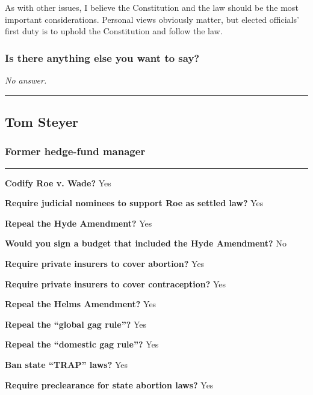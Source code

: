As with other issues, I believe the Constitution and the law should be
the most important considerations. Personal views obviously matter, but
elected officials' first duty is to uphold the Constitution and follow
the law.

\hypertarget{is-there-anything-else-you-want-to-say-5}{%
\subsubsection{Is there anything else you want to
say?}\label{is-there-anything-else-you-want-to-say-5}}

\emph{No answer.}

\begin{center}\rule{0.5\linewidth}{\linethickness}\end{center}

\hypertarget{tom-steyer}{%
\subsection{Tom Steyer}\label{tom-steyer}}

\hypertarget{former-hedge-fund-manager}{%
\subsubsection{Former hedge-fund
manager}\label{former-hedge-fund-manager}}

\begin{center}\rule{0.5\linewidth}{\linethickness}\end{center}

\textbf{Codify Roe v. Wade?} Yes

\textbf{Require judicial nominees to support Roe as settled law?} Yes

\textbf{Repeal the Hyde Amendment?} Yes

\textbf{Would you sign a budget that included the Hyde Amendment?} No

\textbf{Require private insurers to cover abortion?} Yes

\textbf{Require private insurers to cover contraception?} Yes

\textbf{Repeal the Helms Amendment?} Yes

\textbf{Repeal the ``global gag rule''?} Yes

\textbf{Repeal the ``domestic gag rule''?} Yes

\textbf{Ban state ``TRAP'' laws?} Yes

\textbf{Require preclearance for state abortion laws?} Yes

